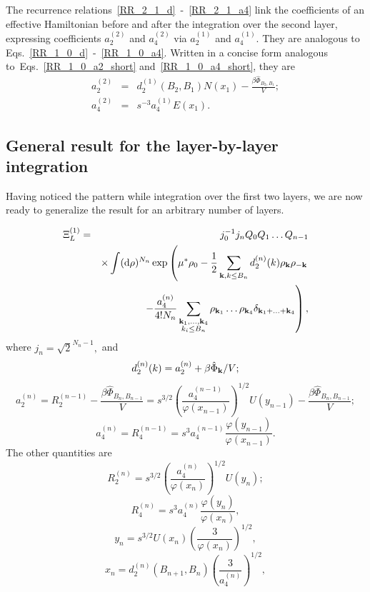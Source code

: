 The recurrence relations~\eqref{RR_2_1_d}~-~\eqref{RR_2_1_a4} link the coefficients of an effective Hamiltonian before and after the integration over the second layer, expressing coefficients $a_2^{(2)}$ and $a_4^{(2)}$ via $a_2^{(1)}$ and $a_4^{(1)}$. They are analogous to Eqs.~\eqref{RR_1_0_d}~-~\eqref{RR_1_0_a4}. Written in a concise form analogous to~Eqs.~\eqref{RR_1_0_a2_short} and~\eqref{RR_1_0_a4_short}, they are
\begin{eqnarray}
	a_2^{(2)} & = & d_2^{(1)}(B_2, B_1) N(x_1) - \frac{\beta\hat{\Phi}_{B_2, B_1}}{V};
	\\
	a_4^{(2)} & = & s^{-3} a_4^{(1)} E(x_1).
\end{eqnarray}

\subsection{General result for the layer-by-layer integration}
Having noticed the pattern while integration over the first two layers, we are now ready to generalize the result for an arbitrary number of layers.

\begin{eqnarray}
	\Xi_L^{(1)} & = & j_0^{-1}j_n Q_0 Q_1 \dotsc Q_{n-1} 
	\\
	&& \times 
	\int ({\rm d} \rho)^{N_n} \exp
	\left(
	\mu^*\rho_0 - \frac{1}{2} \sum_{\vb k, k \leq B_n} d_2^{(n)}(k) \rho_{\vb k} \rho_{-\vb k}
	\right.
	\nonumber \\
	&& 
	\left.
	- \frac{a_4^{(n)}}{4!N_n} \sum_{\substack{\vb k_1, \dotsc, \vb k_4 \\ k_i \leq B_n}}
	\rho_{\vb k_1} \dotsc \rho_{\vb k_4} \delta_{\vb{k}_1 + \dotsc + \vb{k}_4}
	\right)
	\nonumber ,
\end{eqnarray}
where $j_n = \sqrt{2}^{N_n - 1},$ and
\begin{equation}
	\label{RR_n_d}
	d_2^{(n)}(k) = a_2^{(n)} + \beta\hat{\Phi}_{\vb k} / V;
\end{equation}
\begin{equation}
	\label{RR_n_a2}
	a_2^{(n)} = R_2^{(n-1)} - \frac{\beta\hat{\Phi}_{B_n, B_{n-1}}}{V} = s^{3/2} \left(\frac{a_4^{(n-1)}}{\varphi(x_{n-1})}\right)^{1/2} U(y_{n-1})
	- \frac{\beta\hat{\Phi}_{B_n, B_{n-1}}}{V};
\end{equation}
\begin{equation}
	\label{RR_n_a4}
	a_4^{(n)} = R_4^{(n-1)} = s^3 a_4^{(n-1)} \frac{\varphi(y_{n-1})}{\varphi(x_{n-1})}.
\end{equation}
The other quantities are
\begin{equation*}
	R_2^{(n)} = s^{3/2} \left(\frac{a_4^{(n)}}{\varphi(x_n)}\right)^{1/2} U(y_n);
\end{equation*} 
\begin{equation*}
	R_4^{(n)} = s^3 a_4^{(n)} \frac{\varphi(y_n)}{\varphi(x_n)},
\end{equation*}
\begin{equation*}
	y_n = s^{3/2} U(x_n) \left(\frac{3}{\varphi(x_n)}\right)^{1/2},
\end{equation*}
\begin{equation*}
	x_n = d_2^{(n)}(B_{n+1}, B_n) \left(\frac{3}{a_4^{(n)}}\right)^{1/2},
\end{equation*}

